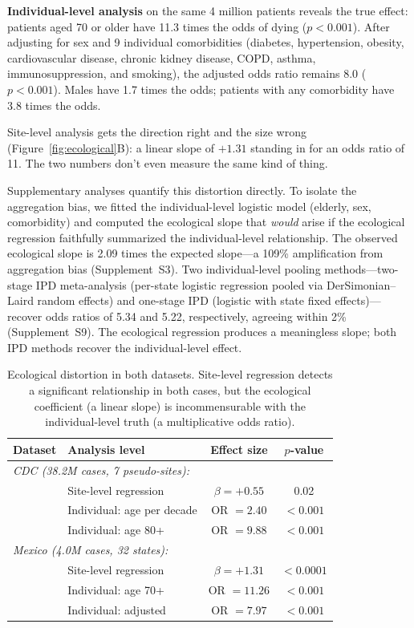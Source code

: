 \documentclass[11pt]{article}
\begin{document}
\textbf{Individual-level analysis} on the same 4 million patients reveals the
true effect: patients aged 70 or older have 11.3 times the odds of dying
($p < 0.001$).  After adjusting for sex and 9 individual comorbidities
(diabetes, hypertension, obesity, cardiovascular disease, chronic kidney
disease, COPD, asthma, immunosuppression, and smoking), the adjusted odds
ratio remains 8.0 ($p < 0.001$).  Males have 1.7 times the odds;
patients with any comorbidity have 3.8 times the odds.

Site-level analysis gets the direction right and the size wrong (Figure~\ref{fig:ecological}B): a linear
slope of $+1.31$ standing in for an odds ratio of 11.  The two numbers
don't even measure the same kind of thing.

Supplementary analyses quantify this distortion directly.  To isolate the
aggregation bias, we fitted the individual-level logistic model
(elderly, sex, comorbidity) and computed the ecological slope that
\emph{would} arise if the ecological regression faithfully summarized the
individual-level relationship.  The observed ecological slope is 2.09 times
the expected slope---a 109\% amplification from aggregation bias
(Supplement~S3).  Two individual-level pooling methods---two-stage IPD
meta-analysis (per-state logistic regression pooled via DerSimonian--Laird
random effects) and one-stage IPD (logistic with state fixed
effects)---recover odds ratios of 5.34 and 5.22, respectively, agreeing
within 2\% (Supplement~S9).  The ecological regression produces a
meaningless slope; both IPD methods recover the individual-level effect.

\begin{table}[t]
\centering
\caption{Ecological distortion in both datasets.  Site-level regression
detects a significant relationship in both cases, but the ecological
coefficient (a linear slope) is incommensurable with the individual-level
truth (a multiplicative odds ratio).}
\label{tab:ecological}
\begin{tabular}{llcc}
\toprule
Dataset & Analysis level & Effect size & $p$-value \\
\midrule
\multicolumn{4}{l}{\emph{CDC (38.2M cases, 7 pseudo-sites):}} \\
& Site-level regression & $\beta = +0.55$ & 0.02 \\
& Individual: age per decade & OR $= 2.40$ & $< 0.001$ \\
& Individual: age 80+ & OR $= 9.88$ & $< 0.001$ \\
\midrule
\multicolumn{4}{l}{\emph{Mexico (4.0M cases, 32 states):}} \\
& Site-level regression & $\beta = +1.31$ & $< 0.0001$ \\
& Individual: age 70+ & OR $= 11.26$ & $< 0.001$ \\
& Individual: adjusted & OR $= 7.97$ & $< 0.001$ \\
\bottomrule
\end{tabular}
\end{table}
\end{document}
